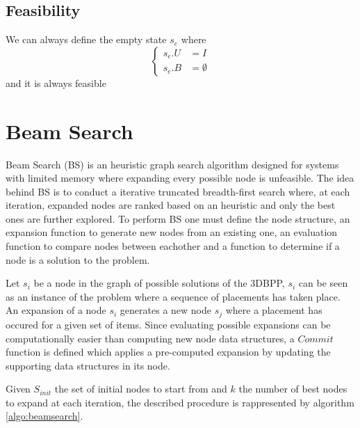 \subsection{Feasibility}
\label{sec:problem_state:feasibility}%

\begin{observation}
    \label{def:empty_state}
    We can always define the empty state $s_e$ where \begin{equation*}
        \left\{ 
            \begin{aligned}
            s_e.U & = I \\
            s_e.B & = \emptyset
            \end{aligned}
        \right.
    \end{equation*}
    and it is always feasible
\end{observation}

\section{Beam Search}
\label{sec:beamsearch}%
Beam Search (BS) %
is an heuristic graph search algorithm designed for systems with limited memory where expanding every possible node is unfeasible.
The idea behind BS is to conduct a iterative truncated breadth-first search where, at each iteration, expanded nodes are ranked based on an heuristic and only the best ones are further explored.
To perform BS one must define the node structure, an expansion function to generate new nodes from an existing one, an evaluation function to compare nodes between eachother and a function to determine if a node is a solution to the problem.


Let $s_i$ be a node in the graph of possible solutions of the 3DBPP, %
$s_i$ can be seen as an instance of the problem where a sequence of placements has taken place.
An expansion of a node $s_i$ generates a new node $s_j$ where a placement has occured for a given set of items.
Since evaluating possible expansions can be computationally easier than computing new node data structures, %
a $Commit$ function is defined which applies a pre-computed expansion by updating the supporting data structures in its node.

Given $S_{init}$ the set of initial nodes to start from and $k$ the number of best nodes to expand at each iteration, the described procedure is rappresented by algorithm \ref{algo:beamsearch}.

